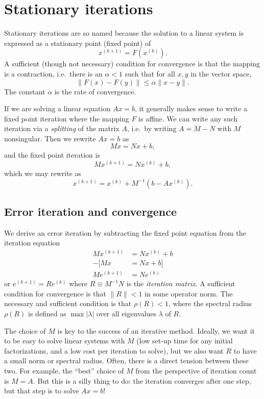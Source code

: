 \documentclass[12pt, leqno]{article} %
\begin{document}
\section{Stationary iterations}

Stationary iterations are so named because the solution to a linear
system is expressed as a stationary point (fixed point) of
\[
  x^{(k+1)} = F(x^{(k)}).
\]
A sufficient (though not necessary) condition for convergence is that
the mapping is a contraction, i.e.~there is an $\alpha < 1$ such that
for all $x, y$ in the vector space,
\[
  \|F(x)-F(y)\| \leq \alpha \|x-y\|.
\]
The constant $\alpha$ is the rate of convergence.

If we are solving a linear equation $Ax = b$, it generally makes sense
to write a fixed point iteration where the mapping $F$ is affine.  We
can write any such iteration via a {\em splitting} of the matrix $A$,
i.e.~by writing $A=M-N$ with $M$ nonsingular.  Then we rewrite $Ax = b$
as
\[
  Mx = Nx + b,
\]
and the fixed point iteration is
\[
  Mx^{(k+1)} = Nx^{(k)} + b,
\]
which we may rewrite as
\[
  x^{(k+1)} = x^{(k)} + M^{-1} (b-Ax^{(k)}).
\]

\subsection{Error iteration and convergence}

We derive an error iteration by subtracting the fixed point equation
from the iteration equation
\begin{align*}
  M x^{(k+1)} &= Nx^{(k)} + b \\
  -[M x &= Nx + b] \\ \hline
  Me^{(k+1)} &= N e^{(k)}
\end{align*}
or $e^{(k+1)} = R e^{(k)}$ where $R \equiv M^{-1} N$ is
the {\em iteration matrix}.  A sufficient condition for convergence
is that $\|R\| < 1$ in some operator norm.  The necessary and sufficient
condition is that $\rho(R) < 1$, where the spectral radius $\rho(R)$
is defined as $\max |\lambda|$ over all eigenvalues $\lambda$ of $R$.

The choice of $M$ is key to the success of an iterative method.
Ideally, we want it to be easy to solve linear systems with $M$
(low set-up time for any initial factorizations, and a low cost
per iteration to solve), but we also want $R$ to have a small
norm or spectral radius.  Often, there is a direct tension between
these two.  For example, the ``best'' choice of $M$ from the perspective
of iteration count is $M = A$.  But this is a silly thing to do:
the iteration converges after one step, but that step is to solve
$Ax = b$!
\end{document}
